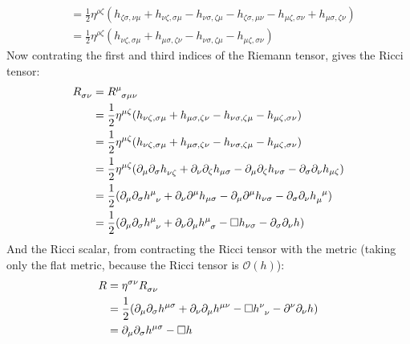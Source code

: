 \documentclass[12pt,a4]{article}
\begin{document}
\begin{enumerate}
\begin{align*}
                                      &= \frac{1}{2}\eta^{\rho \zeta} (h_{\zeta\sigma, \nu\mu} + h_{\nu\zeta, \sigma\mu} - h_{\nu\sigma, \zeta\mu} - h_{\zeta\sigma, \mu\nu} - h_{\mu\zeta, \sigma\nu} + h_{\mu\sigma, \zeta\nu})\\
                                      &= \frac{1}{2}\eta^{\rho \zeta} (h_{\nu\zeta, \sigma\mu} + h_{\mu\sigma, \zeta\nu} - h_{\nu\sigma, \zeta\mu} - h_{\mu\zeta, \sigma\nu})
    \end{align*}
    Now contrating the first and third indices of the Riemann tensor, gives the Ricci tensor:
    \begin{align*}
      \tensor{R}{_\sigma_\nu} &= \tensor{R}{^\mu_\sigma_\mu_\nu} \\
                              &= \frac{1}{2}\eta^{\mu\zeta} (h_{\nu\zeta, \sigma\mu} + h_{\mu\sigma, \zeta\nu} - h_{\nu\sigma, \zeta\mu} - h_{\mu\zeta, \sigma\nu})\\
                              &= \frac{1}{2}\eta^{\mu\zeta} (h_{\nu\zeta, \sigma\mu} + h_{\mu\sigma, \zeta\nu} - h_{\nu\sigma, \zeta\mu} - h_{\mu\zeta, \sigma\nu})\\
                              &= \frac{1}{2}\eta^{\mu\zeta} (\partial_\mu \partial_\sigma\tensor{h}{_\nu_\zeta} + \partial_\nu \partial_\zeta h_{\mu\sigma} - \partial_\mu \partial_\zeta h_{\nu\sigma} - \partial_\sigma \partial_\nu h_{\mu\zeta})\\
                              &= \frac{1}{2} (\partial_\mu \partial_\sigma\tensor{h}{^\mu_\nu} + \partial_\nu \partial^\mu h_{\mu\sigma} - \partial_\mu \partial^\mu h_{\nu\sigma} - \partial_\sigma \partial_\nu \tensor{h}{_\mu^\mu})\\
                              &= \frac{1}{2} (\partial_\mu \partial_\sigma\tensor{h}{^\mu_\nu} + \partial_\nu \partial_\mu \tensor{h}{^\mu_\sigma} - \Box h_{\nu\sigma} - \partial_\sigma \partial_\nu h)
    \end{align*}
    And the Ricci scalar, from contracting the Ricci tensor with the metric (taking only the flat metric, because the Ricci tensor is $\mathcal{O}(h)$):
    \begin{align*}
      R &= \eta^{\sigma\nu}\tensor{R}{_\sigma_\nu}\\ 
        &= \frac{1}{2} (\partial_\mu \partial_\sigma\tensor{h}{^\mu^\sigma} + \partial_\nu \partial_\mu \tensor{h}{^\mu^\nu} - \Box \tensor{h}{^\nu_\nu} - \partial^\nu \partial_\nu h)\\
        &= \partial_\mu \partial_\sigma\tensor{h}{^\mu^\sigma}- \Box h 
    \end{align*}

\end{enumerate}
\end{document}

